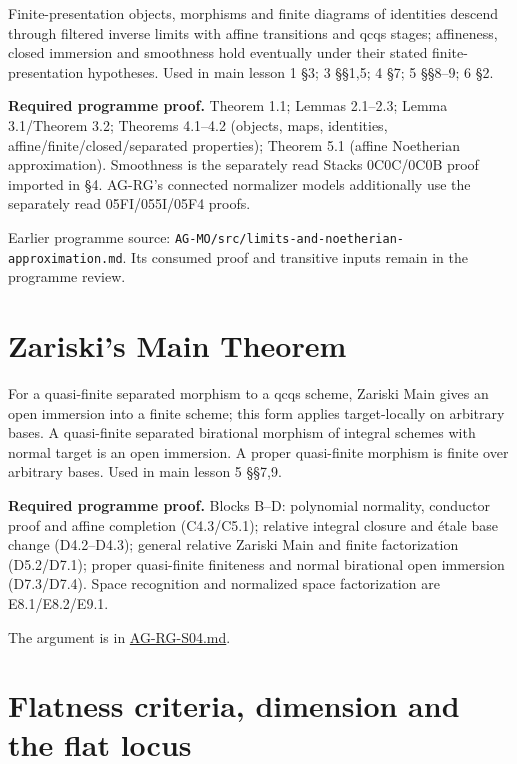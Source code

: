\documentclass[11pt,a4paper,openany]{report}
\begin{document}
Finite-presentation objects, morphisms and finite diagrams of identities descend through filtered inverse limits with affine transitions and qcqs stages; affineness, closed immersion and smoothness hold eventually under their stated finite-presentation hypotheses. Used in main lesson 1 §3; 3 §§1,5; 4 §7; 5 §§8--9; 6 §2.

\textbf{Required programme proof.} Theorem 1.1; Lemmas 2.1--2.3; Lemma 3.1/Theorem 3.2; Theorems 4.1--4.2 (objects, maps, identities, affine/finite/closed/separated properties); Theorem 5.1 (affine Noetherian approximation). Smoothness is the separately read Stacks 0C0C/0C0B proof imported in §4. AG-RG's connected normalizer models additionally use the separately read 05FI/055I/05F4 proofs.

Earlier programme source: \texttt{AG-MO/src/limits-and-noetherian-approximation.md}. Its consumed proof and transitive inputs remain in the programme review.

\section{Zariski's Main Theorem}\label{zariskis-main-theorem}

For a quasi-finite separated morphism to a qcqs scheme, Zariski Main gives an open immersion into a finite scheme; this form applies target-locally on arbitrary bases. A quasi-finite separated birational morphism of integral schemes with normal target is an open immersion. A proper quasi-finite morphism is finite over arbitrary bases. Used in main lesson 5 §§7,9.

\textbf{Required programme proof.} Blocks B--D: polynomial normality, conductor proof and affine completion (C4.3/C5.1); relative integral closure and étale base change (D4.2--D4.3); general relative Zariski Main and finite factorization (D5.2/D7.1); proper quasi-finite finiteness and normal birational open immersion (D7.3/D7.4). Space recognition and normalized space factorization are E8.1/E8.2/E9.1.

The argument is in \href{https://github.com/KokunoYumeto/open-math-courses/blob/main/docs/courses/AG-RG/AG-RG-S04.md}{AG-RG-S04.md}.

\section{Flatness criteria, dimension and the flat locus}\label{flatness-criteria-dimension-and-the-flat-locus}
\end{document}
